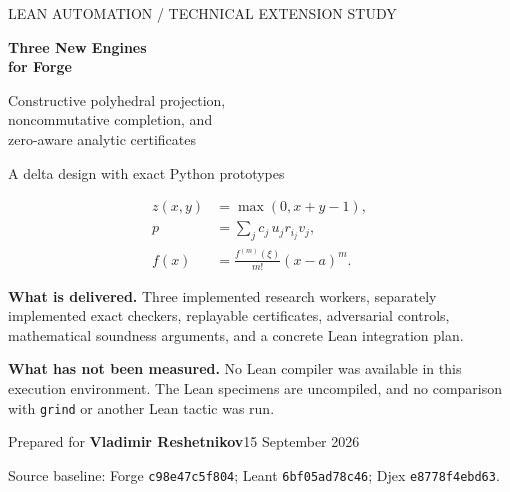 \documentclass[11pt,a4paper]{article}
\theoremstyle{definition}\newtheorem{definition}[theorem]{Definition}
\theoremstyle{remark}\newtheorem{remark}[theorem]{Remark}
\newcommand{\code}[1]{\texttt{#1}}
\newcommand{\grind}{\code{grind}}
\begin{document}
\begin{titlepage}
\thispagestyle{empty}
{\sffamily\color{accent}\large LEAN AUTOMATION / TECHNICAL EXTENSION STUDY}\par
\vspace{1.4cm}
{\fontsize{34}{39}\selectfont\bfseries Three New Engines\\for Forge}\par
\vspace{0.8cm}
{\Large Constructive polyhedral projection,\\noncommutative completion, and\\zero-aware analytic certificates}\par
\vspace{1.0cm}
{\large A delta design with exact Python prototypes}\par
\vspace{1.2cm}
\begin{align*}
 z(x,y)&=\max(0,x+y-1),\\[0.4em]
 p&=\sum_j c_j\,u_jr_{i_j}v_j,\\[0.4em]
 f(x)&=\frac{f^{(m)}(\xi)}{m!}(x-a)^m.
\end{align*}
\vfill
\begin{focusbox}
\textbf{What is delivered.} Three implemented research workers, separately implemented exact checkers, replayable certificates, adversarial controls, mathematical soundness arguments, and a concrete Lean integration plan.\par
\textbf{What has not been measured.} No Lean compiler was available in this execution environment. The Lean specimens are uncompiled, and no comparison with \grind{} or another Lean tactic was run.
\end{focusbox}
\vspace{0.6cm}
Prepared for \textbf{Vladimir Reshetnikov}\hfill 15 September 2026\par
\small Source baseline: Forge \code{c98e47c5f804}; Leant \code{6bf05ad78c46}; Djex \code{e8778f4ebd63}.
\end{titlepage}
\end{document}
